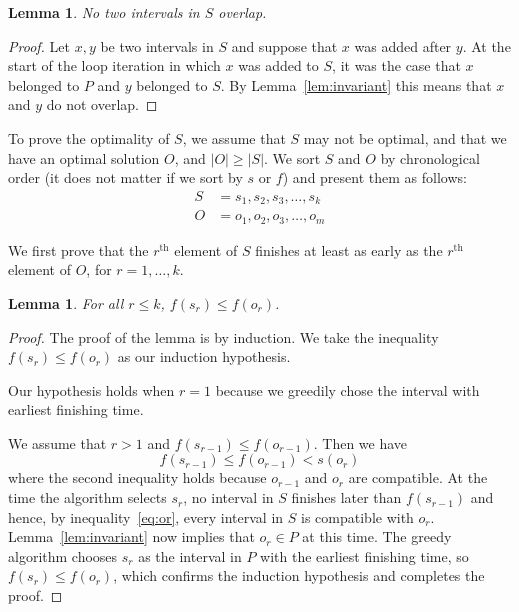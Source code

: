 \documentclass[12pt]{article}
\newtheorem{lemma}[theorem]{Lemma}
\newcommand*\Th[1]{{#1}^{\textrm{th}}}
\begin{document}
\begin{lemma} \label{lem:no-overlap}
No two intervals in $S$ overlap.
\end{lemma}
\begin{proof}
Let $x,y$ be two intervals in $S$ and suppose that $x$ was added
after $y$. At the start of the loop iteration in which $x$ was 
added to $S$, it was the case that $x$ belonged to $P$ and $y$
belonged to $S$. By Lemma~\ref{lem:invariant} this means that
$x$ and $y$ do not overlap.
\end{proof}

To prove the optimality of $S$, we assume that $S$ may not be optimal, and that we have an optimal solution $O$, and $|O| \geq |S|$.
We sort $S$ and $O$ by chronological order (it does not matter if we sort by $s$ or $f$) and present them as follows:
\begin{align*}
S &= s_1, s_2, s_3, \ldots , s_k\\
O &= o_1, o_2, o_3, \ldots , o_m
\end{align*}

We first prove that the $\Th{r}$ element of $S$ finishes at least as early as the $\Th{r}$ element of $O$, for $r=1,\ldots,k$.
\begin{lemma} \label{lem:induct}
For all $r \leq k$, $f(s_r)  \leq f(o_r)$.
\end{lemma}
\begin{proof}
The proof of the lemma is by induction. We take the inequality
$f(s_r) \leq f(o_r)$ as our induction hypothesis.

 Our hypothesis holds when $r = 1$ because we greedily chose the interval with earliest finishing time.

 We assume that $r>1$ and $f(s_{r - 1})  \leq f(o_{r - 1})$. Then we have 
\begin{equation} \label{eq:or} 
f(s_{r - 1})  \leq f(o_{r - 1}) < s(o_r)
\end{equation}
where the second inequality holds because $o_{r-1}$ and $o_r$ are
compatible. At the time the algorithm selects $s_r$, no interval
in $S$ finishes later than $f(s_{r-1})$ and hence, by inequality~\eqref{eq:or},
every interval in $S$ is compatible with $o_r$. Lemma~\ref{lem:invariant}
now implies that $o_r \in P$ at this time. The greedy algorithm chooses
$s_r$ as the interval in $P$ with the earliest finishing time, so
$f(s_r) \leq f(o_r)$, which confirms the induction hypothesis and
completes the proof.
\end{proof}
\end{document}
